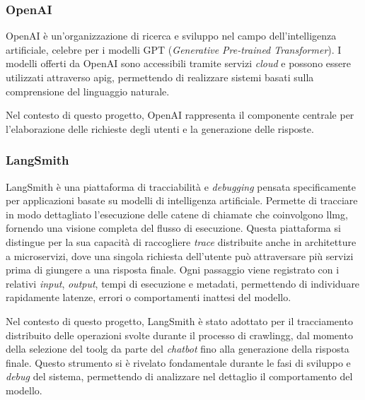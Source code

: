 \subsubsection{OpenAI}
OpenAI è un'organizzazione di ricerca e sviluppo nel campo 
dell'intelligenza artificiale, celebre per i modelli 
GPT (\textit{Generative Pre-trained Transformer}).
I modelli offerti da OpenAI sono accessibili tramite servizi \textit{cloud} e 
possono essere utilizzati attraverso \gls{apig}, permettendo di 
realizzare sistemi basati sulla comprensione del linguaggio naturale.

Nel contesto di questo progetto, OpenAI rappresenta il componente 
centrale per l'elaborazione delle richieste 
degli utenti e la generazione delle risposte.

\subsubsection{LangSmith}

LangSmith è una piattaforma di tracciabilità e \textit{debugging} pensata specificamente per applicazioni basate 
su modelli di intelligenza artificiale. 
Permette di tracciare in modo dettagliato l'esecuzione delle catene di chiamate che coinvolgono \gls{llmg}, 
fornendo una visione completa del flusso di esecuzione.
Questa piattaforma si distingue per la sua capacità di raccogliere \textit{trace} distribuite anche in architetture 
a microservizi, dove una singola richiesta dell'utente può attraversare più servizi prima di giungere a 
una risposta finale. 
Ogni passaggio viene registrato con i relativi \textit{input}, \textit{output}, tempi di esecuzione e metadati, 
permettendo di individuare rapidamente latenze, errori o comportamenti inattesi del modello.

Nel contesto di questo progetto, LangSmith è stato adottato per il tracciamento distribuito delle operazioni 
svolte durante il processo di \gls{crawlingg}, dal momento della selezione del \gls{toolg} da parte 
del \textit{chatbot} fino alla generazione della risposta finale. 
Questo strumento si è rivelato fondamentale durante le fasi di sviluppo e \textit{debug} del sistema, 
permettendo di analizzare nel dettaglio il comportamento del modello.

